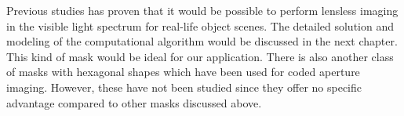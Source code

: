 Previous studies\cite{Toeplitz}\cite{VBoomi}\cite{Flatcam} has proven that it would be possible to perform lensless imaging in the visible light spectrum for real-life object scenes. The detailed solution and modeling of the computational algorithm would be discussed in the next chapter. This kind of mask would be ideal for our application. There is also another class of masks with hexagonal shapes\cite{hexagonal}\cite{hexagonal2} which have been used for coded aperture imaging. However, these have not been studied since they offer no specific advantage compared to other masks discussed above.